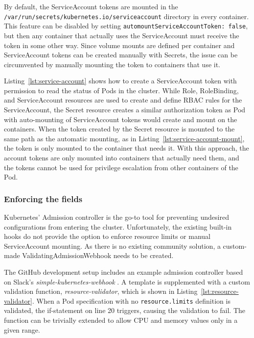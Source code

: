 \documentclass[english, 12pt, a4paper, sci, utf8, a-2b, online]{aaltothesis}
\begin{document}
By default, the ServiceAccount tokens are mounted in the \lstinline{/var/run/secrets/kubernetes.io/serviceaccount} directory in every container.
This feature can be disabled by setting \lstinline{automountServiceAccountToken: false}, but then any container that actually uses the ServiceAccount must receive the token in some other way.
Since volume mounts are defined per container and ServiceAccount tokens can be created manually with Secrets, the issue can be circumvented by manually mounting the token to containers that use it.



Listing~\ref{lst:service-account} shows how to create a ServiceAccount token with permission to read the status of Pods in the cluster.
While Role, RoleBinding, and ServiceAccount resources are used to create and define RBAC rules for the ServiceAccount, the Secret resource creates a similar authorization token as Pod with auto-mounting of ServiceAccount tokens would create and mount on the containers.
When the token created by the Secret resource is mounted to the same path as the automatic mounting, as in Listing~\ref{lst:service-account-mount}, the token is only mounted to the container that needs it.
With this approach, the account tokens are only mounted into containers that actually need them, and the tokens cannot be used for privilege escalation from other containers of the Pod.



\subsubsection{Enforcing the fields}

Kubernetes' Admission controller is the go-to tool for preventing undesired configurations from entering the cluster.
Unfortunately, the existing built-in hooks do not provide the option to enforce resource limits or manual ServiceAccount mounting.
As there is no existing community solution, a custom-made ValidatingAdmissionWebhook needs to be created.

The GitHub development setup includes an example admission controller based on Slack's \emph{simple-kubernetes-webhook} \cite{simple-kubernetes-webhook}.
A template is supplemented with a custom validation function, \emph{resource-validator}, which is shown in Listing~\ref{lst:resource-validator}.
When a Pod specification with no \lstinline{resource.limits} definition is validated, the if-statement on line 20 triggers, causing the validation to fail.
The function can be trivially extended to allow CPU and memory values only in a given range.
\end{document}
